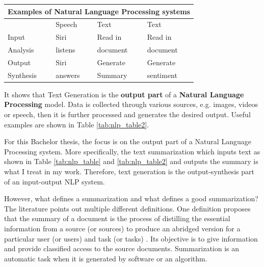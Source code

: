 \begin{center} 
	\begin{tabular}{ |p{3cm}||p{3cm}|p{3cm}|p{3cm}|}
		\hline
		\multicolumn{4}{|c|}{\textbf{Examples of Natural Language Processing systems}}\\ \hline\hline
		&Speech &Text &Text \\ \hline
		Input &Siri &Read in &Read in \\
		Analysis &listens  &document     &document \\ \hline \hline
		Output &Siri &\cellcolor[HTML]{F3E687}Generate &Generate \\
		Synthesis &answers & \cellcolor[HTML]{F3E687}Summary &sentiment \\ \hline
	\end{tabular}
	\label{tab:nlp_table2}
\end{center}

It shows that Text Generation is the \textbf{output part} of a \textbf{Natural Language Processing} model. Data is collected through various sources, e.g. images, videos or speech, then it is further processed and generates the desired output. Useful examples are shown in Table \ref{tab:nlp_table2}.

For this Bachelor thesis, the focus is on the output part of a Natural Language Processing system. More specifically, the text summarization which inputs text as shown in Table \ref{tab:nlp_table} and \ref{tab:nlp_table2} and outputs the summary is what I treat in my work. Therefore, text generation is the output-synthesis part of an input-output NLP system.

However, what defines a summarization and what defines a good summarization? The literature points out multiple different definitions. One definition proposes that the summary of a document is the process of distilling the essential information from a source (or sources) to produce an abridged version for a particular user (or users) and task (or tasks) \cite{def}. Its objective is to give information and provide classified access to the source documents. Summarization is an automatic task when it is generated by software or an algorithm.

